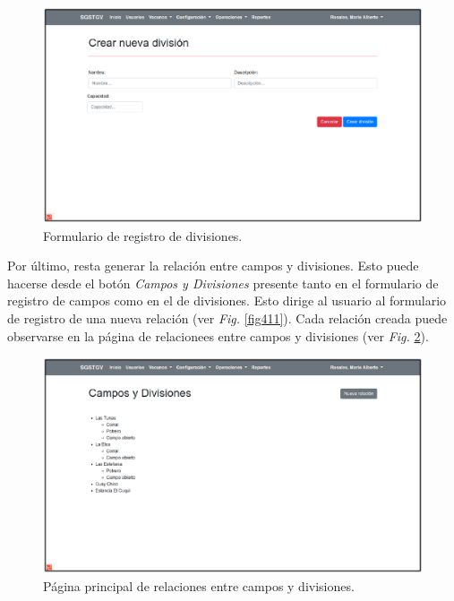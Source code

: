\documentclass[11pt,oneside]{book}
\begin{document}
\begin{figure}[tbhp]
\centerline{\includegraphics[scale=0.87]{figs/capitulo_4_desarrollo/fig409.pdf}}
\caption{Formulario de registro de divisiones.}
\label{fig409}
\end{figure}

\newpage
Por último, resta generar la relación entre campos y divisiones. Esto puede hacerse desde el botón \textit{Campos y Divisiones} presente tanto en el formulario de registro de campos como en el de divisiones. Esto dirige al usuario al formulario de registro de una nueva relación (ver \textit{Fig.} \ref{fig411}). Cada relación creada puede observarse en la página de relacionees entre campos y divisiones (ver \textit{Fig.} \ref{fig410}).

\begin{figure}[tbhp]
\centerline{\includegraphics[scale=0.87]{figs/capitulo_4_desarrollo/fig410.pdf}}
\caption{Página principal de relaciones entre campos y divisiones.}
\label{fig410}
\end{figure}
\end{document}
